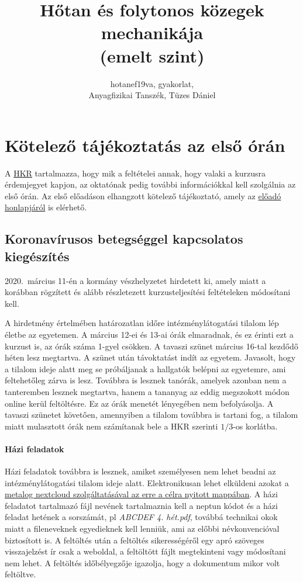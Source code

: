 \documentclass[12pt,a4paper]{scrartcl}
\begin{document}
\title{Hőtan és folytonos közegek mechanikája\\(emelt szint)}
\author{hotanef19va, gyakorlat,\\Anyagfizikai Tanszék, Tüzes Dániel}
\maketitle
\tableofcontents
\section*{Kötelező tájékoztatás az első órán}
A \href{https://www.elte.hu/file/ELTE_SZMSZ_II.pdf}{HKR} tartalmazza, hogy mik a feltételei annak, hogy valaki a kurzusra érdemjegyet kapjon, az oktatónak pedig további információkkal kell szolgálnia az első órán. Az első előadáson elhangzott kötelező tájékoztató, amely az \href{http://ispanovity.web.elte.hu/teaching/}{előadó honlapjáról} is elérhető.

\subsection{Koronavírusos betegséggel kapcsolatos kiegészítés}
2020.\ március 11-én a kormány vészhelyzetet hirdetett ki, amely miatt a korábban rögzített és alább részletezett kurzusteljesítési feltételeken módosítani kell.

A hirdetmény értelmében határozatlan időre intézménylátogatási tilalom lép életbe az egyetemen. A március 12-ei és 13-ai órák elmaradnak, és ez érinti ezt a kurzust is, az órák száma 1-gyel csökken. A tavaszi szünet március 16-tal kezdődő héten lesz megtartva. A szünet után távoktatást indít az egyetem. Javasolt, hogy a tilalom ideje alatt meg se próbáljanak a hallgatók belépni az egyetemre, ami feltehetőleg zárva is lesz. Továbbra is lesznek tanórák, amelyek azonban nem a tanteremben lesznek megtartva, hanem a tananyag az eddig megszokott módon online kerül feltöltésre. Ez az órák menetét lényegében nem befolyásolja. A tavaszi szünetet követően, amennyiben a tilalom továbbra is tartani fog, a tilalom miatt mulasztott órák nem számítanak bele a HKR szerinti $1/3$-os korlátba.

\paragraph{Házi feladatok} Házi feladatok továbbra is lesznek, amiket személyesen nem lehet beadni az intézménylátogatási tilalom ideje alatt. Elektronikusan lehet elküldeni azokat a \href{https://metalog.elte.hu/nextcloud/index.php/s/kBrEWKzdcGWSmsY}{metalog nextcloud szolgáltatásával az erre a célra nyitott mappában}. A házi feladatot tartalmazó fájl nevének tartalmaznia kell a neptun kódot és a házi feladat hetének a sorszámát, pl \textit{ABCDEF 4. hét.pdf}, továbbá technikai okok miatt a fileneveknek egyedieknek kell lenniük, ami az előbbi névkonvencióval biztosított is. A feltöltés után a feltöltés sikerességéről egy apró szöveges visszajelzést ír csak a weboldal, a feltöltött fájlt megtekinteni vagy módosítani nem lehet. A feltöltés időbélyegzője igazolja, hogy a dokumentum mikor volt feltöltve.
\end{document}
